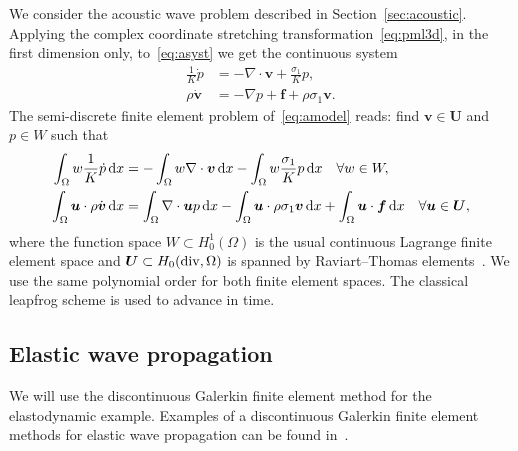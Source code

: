 \documentclass[a4paper]{article}
\renewcommand{\vec}{\boldsymbol}
\begin{document}
We consider the acoustic wave problem described in
Section~\ref{sec:acoustic}. Applying the complex coordinate stretching
transformation~\eqref{eq:pml3d}, in the first dimension only,
to~\eqref{eq:asyst} we get the continuous system
\begin{equation}
  \begin{aligned}
    \frac{1}{K}\Dot{p} &=  -\nabla \cdot \vec{v} + \frac{\sigma_1}{K} p,
    \\
    \rho \Dot{\vec{v}} &=  -\nabla p + \vec{f} + \rho\sigma_1 \vec{v}.
  \end{aligned}
  \label{eq:amodel}
\end{equation}
The semi-discrete finite element problem of~\eqref{eq:amodel} reads:
find $\vec{v} \in \vec{U}$ and $p \in W$ such that
\begin{equation}
  \begin{aligned}
    \int_{\Omega} w \frac{1}{K} \Dot{p} \dif x
    &= -\int_{\Omega} w \nabla \cdot \vec{v} \dif x
    - \int_{\Omega} w \frac{\sigma_{1}}{K} p \dif x
    \quad \forall w \in W,
    \\
    \int_{\Omega} \vec{u} \cdot \rho \Dot{\vec{v}} \dif x
    & = \int_{\Omega} \nabla \cdot \vec{u} p \dif x
    - \int_{\Omega} \vec{u} \cdot \rho \sigma_{1}\vec{v} \dif x
    + \int_{\Omega} \vec{u} \cdot \vec{f} \dif x
    \quad \forall \vec{u} \in \vec{U},
  \end{aligned}
  \label{discretevaracosutic}
\end{equation}
where the function space $W \subset H^{1}_{0}(\Omega)$ is the usual
continuous Lagrange finite element space and $\vec{U} \subset
H_{0}({\rm div}, \Omega)$ is spanned by Raviart--Thomas
elements~\citep{raviart77thomas}. We use the same polynomial order for
both finite element spaces.  The classical leapfrog scheme is used to
advance in time.

\subsection{Elastic wave propagation}
\label{sec:eddiscr}

We will use the discontinuous Galerkin finite element method for the
elastodynamic example. Examples of a discontinuous Galerkin finite
element methods for elastic wave propagation can be found
in~\citep{boumatar12etall, etienne10etall}.
\end{document}
